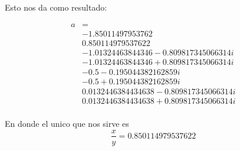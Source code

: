\documentclass{report}
\begin{document}


Esto nos da como resultado:

\begin{align*}
  a &= \\
  &-1.85011497953762\\
  &0.850114979537622\\
  &-1.01324463844346 - 0.809817345066314 i\\
  &-1.01324463844346 + 0.809817345066314 i\\
  &-0.5 - 0.195044382162859 i\\
  &-0.5 + 0.195044382162859 i\\
  &0.0132446384434638 - 0.809817345066314 i\\
  &0.0132446384434638 + 0.809817345066314 i\\
\end{align*}

En donde el unico que nos sirve es $$\frac{x}{y} = 0.850114979537622$$
\end{document}
